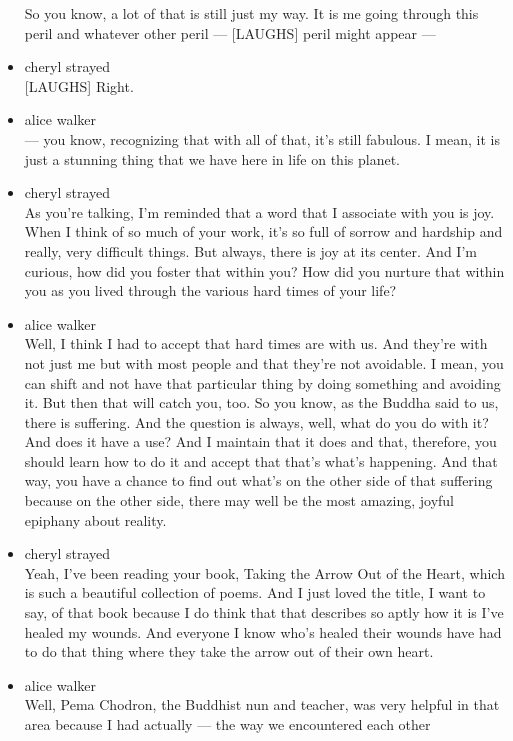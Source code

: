 \begin{itemize}
  So you know, a lot of that is still just my way. It is me going
  through this peril and whatever other peril --- {[}LAUGHS{]} peril
  might appear ---
\item
  cheryl strayed\\
  {[}LAUGHS{]} Right.
\item
  alice walker\\
  --- you know, recognizing that with all of that, it's still fabulous.
  I mean, it is just a stunning thing that we have here in life on this
  planet.
\item
  cheryl strayed\\
  As you're talking, I'm reminded that a word that I associate with you
  is joy. When I think of so much of your work, it's so full of sorrow
  and hardship and really, very difficult things. But always, there is
  joy at its center. And I'm curious, how did you foster that within
  you? How did you nurture that within you as you lived through the
  various hard times of your life?
\item
  alice walker\\
  Well, I think I had to accept that hard times are with us. And they're
  with not just me but with most people and that they're not avoidable.
  I mean, you can shift and not have that particular thing by doing
  something and avoiding it. But then that will catch you, too. So you
  know, as the Buddha said to us, there is suffering. And the question
  is always, well, what do you do with it? And does it have a use? And I
  maintain that it does and that, therefore, you should learn how to do
  it and accept that that's what's happening. And that way, you have a
  chance to find out what's on the other side of that suffering because
  on the other side, there may well be the most amazing, joyful epiphany
  about reality.
\item
  cheryl strayed\\
  Yeah, I've been reading your book, Taking the Arrow Out of the Heart,
  which is such a beautiful collection of poems. And I just loved the
  title, I want to say, of that book because I do think that that
  describes so aptly how it is I've healed my wounds. And everyone I
  know who's healed their wounds have had to do that thing where they
  take the arrow out of their own heart.
\item
  alice walker\\
  Well, Pema Chodron, the Buddhist nun and teacher, was very helpful in
  that area because I had actually --- the way we encountered each other

\end{itemize}
